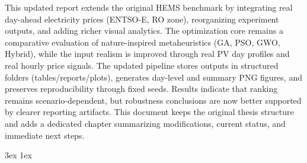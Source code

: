\documentclass[final,12pt]{ubb_dolgozat}
\begin{document}
\maketitle

\begin{abstractEN}
This updated report extends the original HEMS benchmark by integrating real day-ahead electricity prices (ENTSO-E, RO zone), reorganizing experiment outputs, and adding richer visual analytics. The optimization core remains a comparative evaluation of nature-inspired metaheuristics (GA, PSO, GWO, Hybrid), while the input realism is improved through real PV day profiles and real hourly price signals. The updated pipeline stores outputs in structured folders (tables/reports/plots), generates day-level and summary PNG figures, and preserves reproducibility through fixed seeds. Results indicate that ranking remains scenario-dependent, but robustness conclusions are now better supported by clearer reporting artifacts. This document keeps the original thesis structure and adds a dedicated chapter summarizing modifications, current status, and immediate next steps.
\end{abstractEN}

{ \baselineskip 3ex
  \parskip 1ex
  \tableofcontents
}

\setcounter{page}{1}









\appendix




\end{document}

